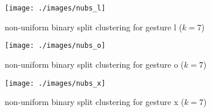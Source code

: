 \begin{figure}[h]
  \centering
  \texttt{[image: ./images/nubs\_l]}
  \caption{non-uniform binary split clustering for gesture l ($k=7$)}
  \label{fig:nubs_gesture_l}
\end{figure}
\begin{figure}[h]
  \centering
  \texttt{[image: ./images/nubs\_o]}
  \caption{non-uniform binary split clustering for gesture o ($k=7$)}
  \label{fig:nubs_gesture_o}
\end{figure}
\begin{figure}[h]
  \centering
  \texttt{[image: ./images/nubs\_x]}
  \caption{non-uniform binary split clustering for gesture x ($k=7$)}
  \label{fig:nubs_gesture_x}
\end{figure}


